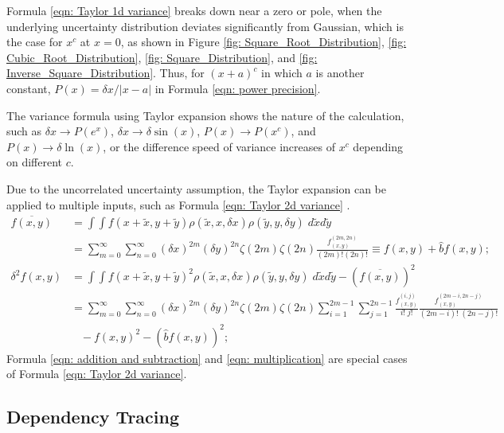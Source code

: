 \documentclass[twoside]{article}
\numberwithin{equation}{section}
\newcommand{\eqspace}{\;\;\;}
\begin{document}
Formula \eqref{eqn: Taylor 1d variance} breaks down near a zero or pole, when the underlying uncertainty distribution deviates significantly from Gaussian, which is the case for $x^c$ at $x=0$, as shown in Figure \ref{fig: Square_Root_Distribution}, \ref{fig: Cubic_Root_Distribution}, \ref{fig: Square_Distribution}, and \ref{fig: Inverse_Square_Distribution}.
Thus, for $(x+a)^c$ in which $a$ is another constant, $P(x) = \delta x / |x - a|$ in Formula \eqref{eqn: power precision}.

The variance formula using Taylor expansion shows the nature of the calculation, such as $\delta x \rightarrow P(e^x)$, $\delta x \rightarrow \delta \sin(x)$, $P(x) \rightarrow P(x^c)$, and $P(x) \rightarrow \delta \ln(x)$, or the difference speed of variance increases of $x^c$ depending on different $c$.

Due to the uncorrelated uncertainty assumption, the Taylor expansion can be applied to multiple inputs, such as Formula \eqref{eqn: Taylor 2d variance} \cite{Prev_Precision_Arithmetic} .
\begin{align}
\label{eqn: Taylor 2d mean}
\overline{f(x,y)} &= \int \int f(x + \tilde{x}, y + \tilde{y}) \rho(\tilde{x}, x, \delta x) \rho(\tilde{y}, y, \delta y)\; d \tilde{x} d \tilde{y} \nonumber \\
&= \sum_{m=0}^{\infty} \sum_{n=0}^{\infty} (\delta x)^{2m} (\delta y)^{2n} \zeta(2m) \zeta(2n)  \frac{f^{(2m,2n)}_{(x,y)}}{(2m)! (2n)!}
\equiv f(x,y) + \hat{b} f(x,y); \\
\label{eqn: Taylor 2d variance}
\delta^2 f(x, y) &= \int \int f(x + \tilde{x}, y + \tilde{y})^2 
    \rho(\tilde{x}, x, \delta x) \rho(\tilde{y}, y, \delta y)\; d \tilde{x} d \tilde{y} - \left( \overline{f(x, y)} \right)^2 \nonumber \\
&= \sum_{m=0}^{\infty} \sum_{n=0}^{\infty} (\delta x)^{2m} (\delta y)^{2n} \zeta(2m) \zeta(2n) 
  \sum_{i=1}^{2m-1} \sum_{j=1}^{2n-1} \frac{f^{(i,j)}_{(x,y)}}{i!\;j!}\frac{f^{(2m-i,2n-j)}_{(x,y)}}{(2m-i)!\;(2n-j)!} \nonumber \\
 &\eqspace - f(x,y)^2 - \left( \hat{b} f(x,y) \right)^2; 
\end{align}
Formula \eqref{eqn: addition and subtraction} and \eqref{eqn: multiplication} are special cases of Formula \eqref{eqn: Taylor 2d variance}.


\subsection{Dependency Tracing}
\end{document}

